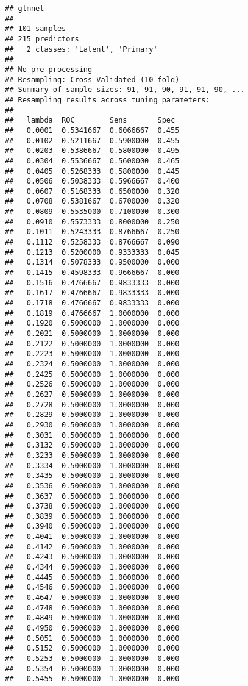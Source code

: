 \documentclass[]{article}
\begin{document}
\begin{verbatim}
## glmnet 
## 
## 101 samples
## 215 predictors
##   2 classes: 'Latent', 'Primary' 
## 
## No pre-processing
## Resampling: Cross-Validated (10 fold) 
## Summary of sample sizes: 91, 91, 90, 91, 91, 90, ... 
## Resampling results across tuning parameters:
## 
##   lambda  ROC        Sens       Spec 
##   0.0001  0.5341667  0.6066667  0.455
##   0.0102  0.5211667  0.5900000  0.455
##   0.0203  0.5386667  0.5800000  0.495
##   0.0304  0.5536667  0.5600000  0.465
##   0.0405  0.5268333  0.5800000  0.445
##   0.0506  0.5038333  0.5966667  0.400
##   0.0607  0.5168333  0.6500000  0.320
##   0.0708  0.5381667  0.6700000  0.320
##   0.0809  0.5535000  0.7100000  0.300
##   0.0910  0.5573333  0.8000000  0.250
##   0.1011  0.5243333  0.8766667  0.250
##   0.1112  0.5258333  0.8766667  0.090
##   0.1213  0.5200000  0.9333333  0.045
##   0.1314  0.5078333  0.9500000  0.000
##   0.1415  0.4598333  0.9666667  0.000
##   0.1516  0.4766667  0.9833333  0.000
##   0.1617  0.4766667  0.9833333  0.000
##   0.1718  0.4766667  0.9833333  0.000
##   0.1819  0.4766667  1.0000000  0.000
##   0.1920  0.5000000  1.0000000  0.000
##   0.2021  0.5000000  1.0000000  0.000
##   0.2122  0.5000000  1.0000000  0.000
##   0.2223  0.5000000  1.0000000  0.000
##   0.2324  0.5000000  1.0000000  0.000
##   0.2425  0.5000000  1.0000000  0.000
##   0.2526  0.5000000  1.0000000  0.000
##   0.2627  0.5000000  1.0000000  0.000
##   0.2728  0.5000000  1.0000000  0.000
##   0.2829  0.5000000  1.0000000  0.000
##   0.2930  0.5000000  1.0000000  0.000
##   0.3031  0.5000000  1.0000000  0.000
##   0.3132  0.5000000  1.0000000  0.000
##   0.3233  0.5000000  1.0000000  0.000
##   0.3334  0.5000000  1.0000000  0.000
##   0.3435  0.5000000  1.0000000  0.000
##   0.3536  0.5000000  1.0000000  0.000
##   0.3637  0.5000000  1.0000000  0.000
##   0.3738  0.5000000  1.0000000  0.000
##   0.3839  0.5000000  1.0000000  0.000
##   0.3940  0.5000000  1.0000000  0.000
##   0.4041  0.5000000  1.0000000  0.000
##   0.4142  0.5000000  1.0000000  0.000
##   0.4243  0.5000000  1.0000000  0.000
##   0.4344  0.5000000  1.0000000  0.000
##   0.4445  0.5000000  1.0000000  0.000
##   0.4546  0.5000000  1.0000000  0.000
##   0.4647  0.5000000  1.0000000  0.000
##   0.4748  0.5000000  1.0000000  0.000
##   0.4849  0.5000000  1.0000000  0.000
##   0.4950  0.5000000  1.0000000  0.000
##   0.5051  0.5000000  1.0000000  0.000
##   0.5152  0.5000000  1.0000000  0.000
##   0.5253  0.5000000  1.0000000  0.000
##   0.5354  0.5000000  1.0000000  0.000
##   0.5455  0.5000000  1.0000000  0.000

\end{verbatim}
\end{document}
